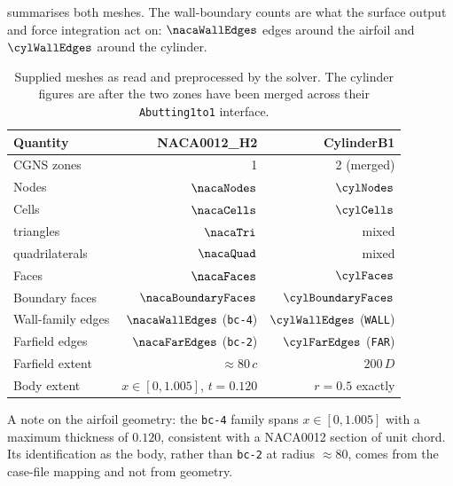  summarises both meshes. The wall-boundary counts are what the
surface output and force integration act on: $\nacaWallEdges$ edges around the
airfoil and $\cylWallEdges$ around the cylinder.

\begin{table}[htbp]
  \centering
  \caption{Supplied meshes as read and preprocessed by the solver. The cylinder
  figures are after the two zones have been merged across their
  \texttt{Abutting1to1} interface.}
  \label{tab:meshes}
  \small
  \begin{tabular}{lrr}
    \toprule
    Quantity & NACA0012\_H2 & CylinderB1 \\
    \midrule
    CGNS zones & 1 & 2 (merged) \\
    Nodes & $\nacaNodes$ & $\cylNodes$ \\
    Cells & $\nacaCells$ & $\cylCells$ \\
    \quad triangles & $\nacaTri$ & mixed \\
    \quad quadrilaterals & $\nacaQuad$ & mixed \\
    Faces & $\nacaFaces$ & $\cylFaces$ \\
    Boundary faces & $\nacaBoundaryFaces$ & $\cylBoundaryFaces$ \\
    Wall-family edges & $\nacaWallEdges$ (\texttt{bc-4}) & $\cylWallEdges$ (\texttt{WALL}) \\
    Farfield edges & $\nacaFarEdges$ (\texttt{bc-2}) & $\cylFarEdges$ (\texttt{FAR}) \\
    Farfield extent & $\approx 80\,c$ & $200\,D$ \\
    Body extent & $x\in[0,1.005]$, $t=0.120$ & $r=0.5$ exactly \\
    \bottomrule
  \end{tabular}
\end{table}

A note on the airfoil geometry: the \texttt{bc-4} family spans $x\in[0,1.005]$
with a maximum thickness of $0.120$, consistent with a NACA0012 section of unit
chord. Its identification as the body, rather than \texttt{bc-2} at radius
$\approx 80$, comes from the case-file mapping and not from geometry.
